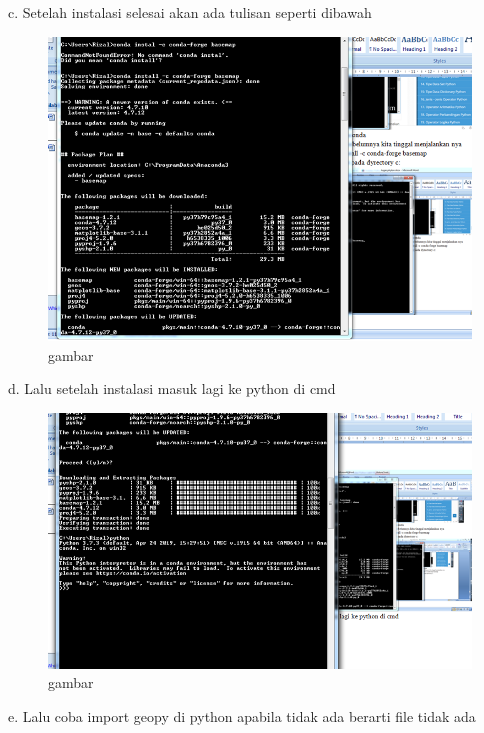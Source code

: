 \begin{enumerate}
c.	Setelah instalasi selesai akan ada tulisan seperti dibawah
\begin{figure}
\begin{center} 
\includegraphics[scale=0.4]{src/soal5phyton2.PNG} 
\caption{gambar} 
\label{unhas} 
\end{center} 
\end{figure}

d.	Lalu setelah instalasi masuk lagi ke python di cmd

\begin{figure}
\begin{center} 
\includegraphics[scale=0.4]{src/soal5phyton3.PNG} 
\caption{gambar} 
\label{unhas} 
\end{center} 
\end{figure}

e.	Lalu coba import geopy di python apabila tidak ada berarti file tidak ada


\end{enumerate}
